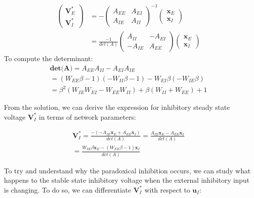 \documentclass[10pt,twocolumn]{article}
\begin{document}
$$
    \begin{align*}
        \begin{pmatrix}
            \textbf{V}^\ast_E \\ \textbf{V}^\ast_I
        \end{pmatrix}
         & =
        -\begin{pmatrix}
             A_{EE} & A_{EI} \\
             A_{IE} & A_{II}
         \end{pmatrix}^{-1}
        \begin{pmatrix}
            \textbf{x}_E \\ \textbf{x}_I
        \end{pmatrix} \\
         & =
        \frac{-1}{det(A)}
        \begin{pmatrix}
            A_{II}  & -A_{EI} \\
            -A_{IE} & A_{EE}
        \end{pmatrix}
        \begin{pmatrix}
            \textbf{x}_E \\ \textbf{x}_I
        \end{pmatrix}
    \end{align*}
$$
To compute the determinant:
$$
    \begin{gathered}
        \textbf{det(A)} = A_{EE}A_{II} - A_{EI}A_{IE} \\
        = (W_{EE}\beta-1)(-W_{II}\beta-1) - W_{EI}\beta (-W_{IE}\beta)\\
        = \boxed{\beta^2(W_{IE}W_{EI}-W_{EE}W_{II}) + \beta(W_{II}+W_{EE}) + 1}
    \end{gathered}
$$

From the solution, we can derive the expression for
inhibitory steady state voltage $\textbf{V}^\ast_I$ in terms of network parameters:

$$
    \begin{gathered}
        \textbf{V}^\ast_I
        = \frac{-(- A_{IE}\textbf{x}_E + A_{EE}\textbf{x}_I)}{det(A)}
        = \frac{A_{IE}\textbf{x}_E - A_{EE}\textbf{x}_I}{det(A)}\\
        = \boxed{\frac{W_{IE}\beta \textbf{x}_E - (W_{EE}\beta - 1) \textbf{x}_I}{det(A)}}
    \end{gathered}
$$

To try and understand why the paradoxical inhibition occurs, we can study
what happens to the stable state inhibitory voltage when the external
inhibitory input is changing. To do so, we can differentiate $\textbf{V}^\ast_I$
with respect to $\textbf{u}_I$:
\end{document}
